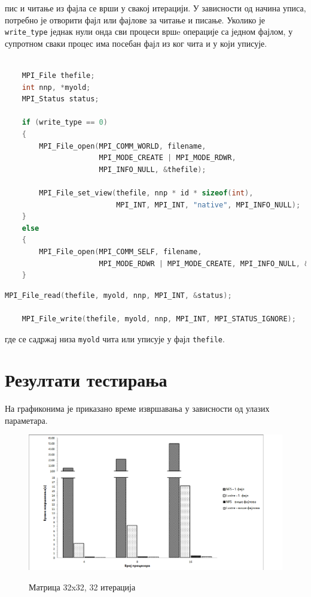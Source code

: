 пис и читање из фајла се врши у свакој итерацији. У зависности од начина уписа, потребно је отворити фајл или фајлове за читање и писање. Уколико је \texttt{write\_type} једнак нули онда сви процеси вршe операције са једном фајлом, у супротном сваки процес има посебан фајл из ког чита и у који уписује.

\begin{lstlisting}[style=nonumbers,frame=single,language=C, caption=Део кода за отварање фајлова за читање и писање]

	MPI_File thefile;
	int nnp, *myold;
	MPI_Status status;	

    if (write_type == 0) 
    {
        MPI_File_open(MPI_COMM_WORLD, filename,
                      MPI_MODE_CREATE | MPI_MODE_RDWR,
                      MPI_INFO_NULL, &thefile);

        MPI_File_set_view(thefile, nnp * id * sizeof(int),
                          MPI_INT, MPI_INT, "native", MPI_INFO_NULL);
    }
    else 
    {
        MPI_File_open(MPI_COMM_SELF, filename,
                      MPI_MODE_RDWR | MPI_MODE_CREATE, MPI_INFO_NULL, &thefile);
    } 
\end{lstlisting}

\begin{lstlisting}[style=nonumbers,frame=single,language=C, caption=Функције за читање и писање у фајл]
	MPI_File_read(thefile, myold, nnp, MPI_INT, &status);
	
	MPI_File_write(thefile, myold, nnp, MPI_INT, MPI_STATUS_IGNORE);
\end{lstlisting}
где се садржај низа \texttt{myold} чита или уписује у фајл \texttt{thefile}.

\newpage
\section{Резултати тестирања}

На графиконима је приказано време извршавања у зависности од улазих параметара. 
 
 \begin{figure}[H]
   \centering
       \includegraphics[width=1\textwidth]{slike/results/32_32.png}\\[1cm]
   \caption{Матрица 32x32, 32 итерација}
 \end{figure}
 
